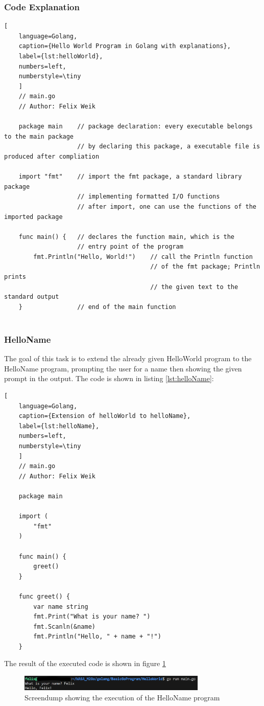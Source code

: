 \subsubsection*{Code Explanation}
\begin{lstlisting}[
    language=Golang,
    caption={Hello World Program in Golang with explanations},
    label={lst:helloWorld},
    numbers=left,
    numberstyle=\tiny
    ]
    // main.go 
    // Author: Felix Weik

    package main    // package declaration: every executable belongs to the main package
                    // by declaring this package, a executable file is produced after compliation
    
    import "fmt"    // import the fmt package, a standard library package 
                    // implementing formatted I/O functions
                    // after import, one can use the functions of the imported package

    func main() {   // declares the function main, which is the 
                    // entry point of the program
        fmt.Println("Hello, World!")    // call the Println function 
                                        // of the fmt package; Println prints 
                                        // the given text to the standard output
    }               // end of the main function
    
\end{lstlisting}

\subsubsection*{HelloName}
The goal of this task is to extend the already given HelloWorld program to the HelloName program, prompting the user for a name then showing the given prompt in the output.
The code is shown in listing \ref{lst:helloName}:
\begin{lstlisting}[
    language=Golang,
    caption={Extension of helloWorld to helloName},
    label={lst:helloName},
    numbers=left,
    numberstyle=\tiny
    ]
    // main.go
    // Author: Felix Weik

    package main

    import (
        "fmt"
    )

    func main() {
        greet()
    }

    func greet() {
        var name string
        fmt.Print("What is your name? ")
        fmt.Scanln(&name)
        fmt.Println("Hello, " + name + "!")
    } 
\end{lstlisting}

The result of the executed code is shown in figure \ref{fig:screendump_helloName}

\begin{figure}
    \centering
    \includegraphics[width=0.8\textwidth]{figures/goLang/helloWorld/golang_helloWorld_helloName.png}
    \caption{Screendump showing the execution of the HelloName program}
    \label{fig:screendump_helloName}
\end{figure}